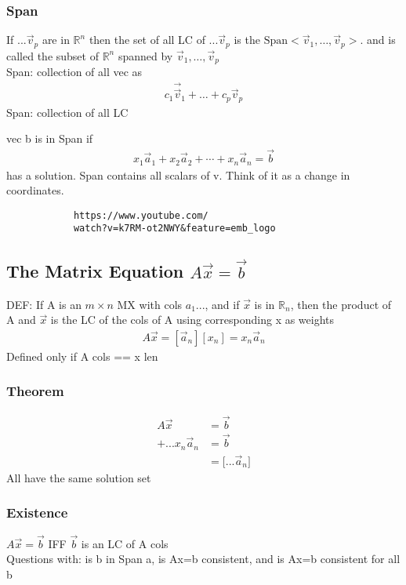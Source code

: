 \documentclass[12pt]{article}
\newcommand{\R}{\mathbb{R}}
\begin{document}
    \subsubsection{Span}
     If $ ...\vec v_p $  are in $ \R^{n} $  then the set of all LC of
     $ ...\vec v_p $  is the $ \text{Span}\big<\vec v_{1},\dots,
     \vec v_{p}\big> $. and is called the subset of $ \R^{n} $ spanned by 
     $ \vec v_{1},\dots,\vec v_{p} $ \\
        Span: collection of all vec as
        \begin{align*}
            c_{1}\vec \vec v_{1} + \dots + c_{p}\vec v_{p}
        \end{align*}
        Span: collection of all LC
        \par
        vec b is in Span if 
        \begin{align*}
             x_{1}\vec a_{1} + x_{2}\vec a_{2} + \cdots + x_{n}\vec a_{n} = \vec b
        \end{align*}
        has a solution.
        Span contains all scalars of v. Think of it as a change in coordinates. 
        \begin{verbatim}
            https://www.youtube.com/
            watch?v=k7RM-ot2NWY&feature=emb_logo
        \end{verbatim}
\subsection{The Matrix Equation $ A\vec x = \vec b $ }
    DEF: If A is an $ m \times n $  MX with cols $ a_{1}... $, and
    if $ \vec x $  is in $ \R_{n} $, then the product of A and $ \vec x $ 
    is the LC of the cols of A using corresponding x as weights
    \begin{align*}
        A\vec x =  [\vec a_{n}][x_{n}] = x_{n}\vec a_{n}
    \end{align*}
    Defined only if A cols == x len
    \subsubsection{Theorem}
        \begin{align*}
            A\vec x &= \vec b \\
            +...x_{n}\vec a_{n} &= \vec b\\
                                &= \big[...\vec a_{n}\big]
        \end{align*}
        All have the same solution set
    \subsubsection{Existence}
        $ A\vec x = \vec b $  IFF $ \vec b $  is an LC of A cols \\
        Questions with: is b in Span a, is Ax=b consistent, and
        is Ax=b consistent for all b
\end{document}
